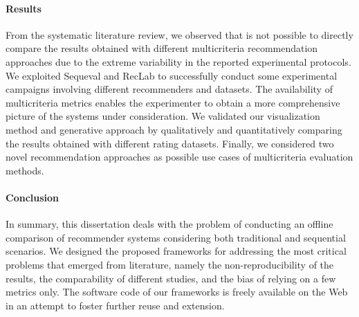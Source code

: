 \paragraph{Results}

From the systematic literature review, we observed that is not possible to directly compare the results obtained with different multicriteria recommendation approaches due to the extreme variability in the reported experimental protocols. We exploited Sequeval and RecLab to successfully conduct some experimental campaigns involving different recommenders and datasets. The availability of multicriteria metrics enables the experimenter to obtain a more comprehensive picture of the systems under consideration. We validated our visualization method and generative approach by qualitatively and quantitatively comparing the results obtained with different rating datasets. Finally, we considered two novel recommendation approaches as possible use cases of multicriteria evaluation methods.

\paragraph{Conclusion}

In summary, this dissertation deals with the problem of conducting an offline comparison of recommender systems considering both traditional and sequential scenarios. We designed the proposed frameworks for addressing the most critical problems that emerged from literature, namely the non-reproducibility of the results, the comparability of different studies, and the bias of relying on a few metrics only. The software code of our frameworks is freely available on the Web in an attempt to foster further reuse and extension.



\tablespagetrue\figurespagetrue

\allcontents

\mainmatter












\appendix



\backmatter

\sloppy
\printbibliography[heading=bibintoc]

\printindex

